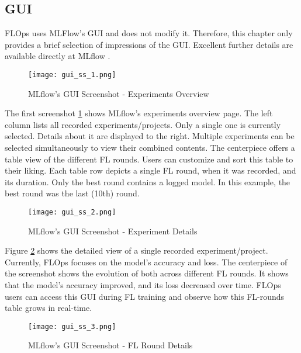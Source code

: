 \subsection{GUI}

FLOps uses MLFlow's GUI and does not modify it.
Therefore, this chapter only provides a brief selection of impressions of the GUI.
Excellent further details are available directly at MLflow \cite{mlflow:homepage}.

\begin{figure}[p]
    \begin{adjustwidth}{-0.1\paperwidth}{-0.1\paperwidth}
        \centering
        \texttt{[image: gui\_ss\_1.png]}
        \caption{MLflow's GUI Screenshot - Experiments Overview}
        \label{fig:gui_ss_1}
    \end{adjustwidth}
\end{figure}

The first screenshot \ref{fig:gui_ss_1} shows MLflow's experiments overview page.
The left column lists all recorded experiments/projects.
Only a single one is currently selected.
Details about it are displayed to the right.
Multiple experiments can be selected simultaneously to view their combined contents.
The centerpiece offers a table view of the different FL rounds.
Users can customize and sort this table to their liking.
Each table row depicts a single FL round, when it was recorded, and its duration.
Only the best round contains a logged model.
In this example, the best round was the last (10th) round.

\begin{figure}[p]
    \begin{adjustwidth}{-0.1\paperwidth}{-0.1\paperwidth}
        \centering
        \texttt{[image: gui\_ss\_2.png]}
        \caption{MLflow's GUI Screenshot - Experiment Details}
        \label{fig:gui_ss_2}
    \end{adjustwidth}
\end{figure}

Figure \ref{fig:gui_ss_2} shows the detailed view of a single recorded experiment/project.
Currently, FLOps focuses on the model's accuracy and loss.
The centerpiece of the screenshot shows the evolution of both across different FL rounds.
It shows that the model's accuracy improved, and its loss decreased over time.
FLOps users can access this GUI during FL training and observe how this FL-rounds table grows in real-time.

\begin{figure}[p]
    \centering
    \texttt{[image: gui\_ss\_3.png]}
    \caption{MLflow's GUI Screenshot - FL Round Details}
    \label{fig:gui_ss_3}
\end{figure}


